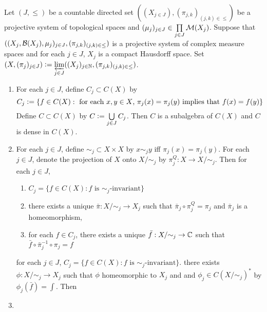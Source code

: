 \documentclass{book}
\begin{document}
\begin{ex}
	Let $(J, {\leq})$ be a countable directed set $((X_{j \in J}), (\pi_{j,k})_{(j,k) \in \leq})$ be a projective system of topological spaces and $(\mu_j)_{j \in J} \in \prod\limits_{j \in J} \mathcal{M}(X_j)$. Suppose that $((X_j, \mathcal{B}(X_j), \mu_j)_{j \in J}, (\pi_{j,k})_{(j,k) \in {\leq}})$ is a projective system of complex measure spaces and for each $j \in J$, $X_j$ is a compact Hausdorff space. Set $(X, (\pi_j)_{j \in J}) \vcentcolon= \varprojlim\limits_{j \in J} ((X_j)_{j \in \mathbb{N}}, (\pi_{j,k})_{(j,k) \in {\leq}})$. 
	\begin{enumerate}
		\item For each $j \in J$, define $C_j \subset C(X)$ by 
		$$C_j \vcentcolon= \{f \in C(X): \text{ for each $x,y \in X$, $\pi_j(x) = \pi_j(y)$ implies that $f(x) = f(y)$}\}$$
		Define $C \subset C(X)$ by $C \vcentcolon= \bigcup\limits_{j \in J} C_j$. Then $C$ is a subalgebra of $C(X)$ and $C$ is dense in $C(X)$. 
		\item For each $j \in J$, define ${\sim_j}  \subset X \times X$ by $x \sim_j y$ iff $\pi_j(x) = \pi_j(y)$. For each $j \in J$, denote the projection of $X$ onto $X/{\sim_j}$ by $\pi^Q_j: X \rightarrow X/{\sim_j}$. Then for each $j \in J$,
		\begin{enumerate}
			\item $C_j = \{f \in C(X): \text{$f$ is $\sim_j$-invariant}\}$
			\item there exists a unique $\bar{\pi}:X/{\sim_j} \rightarrow X_j$ such that $\bar{\pi}_j \circ \pi^Q_j = \pi_j$ and $\bar{\pi}_j$ is a homeomorphism,
			\item for each $f \in C_j$, there exists a unique $\bar{f}:X/{\sim_j} \rightarrow \mathbb{C}$ such that $\bar{f} \circ \bar{\pi}_j^{-1} \circ \pi_j = f$
		\end{enumerate}
		for each $j \in J$, $C_j = \{f \in C(X): \text{$f$ is $\sim_j$-invariant}\}$. there exists $\phi: X / {\sim_j}  \rightarrow X_j$ such that $\phi$ homeomorphic to $X_j$ and and $\phi_j \in C(X/{\sim_j})^*$ by $\phi_j(\bar{f}) = \int$. Then 
		\item 
	\end{enumerate}
\end{ex}
\end{document}
